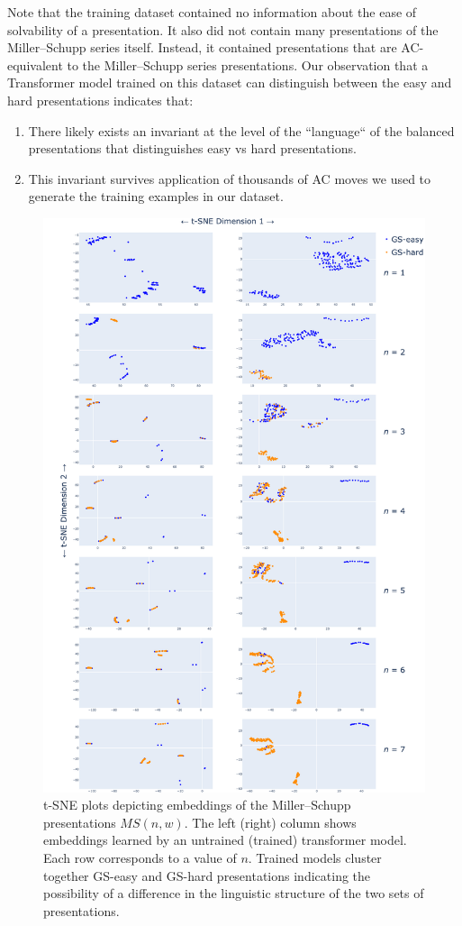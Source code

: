 Note that the training dataset contained no information about the ease of solvability of a presentation.
It also did not contain many presentations of the Miller--Schupp series itself.
Instead, it contained presentations that are AC-equivalent to the Miller--Schupp series presentations.
Our observation that a Transformer model trained on this dataset can distinguish between the easy and hard presentations indicates that:
\begin{enumerate}[label=\alph*)]
	\item There likely exists an invariant at the level of the ``language`` of the balanced presentations that distinguishes easy vs hard presentations.
	\item This invariant survives application of thousands of AC moves we used to generate the training examples in our dataset.
\end{enumerate}

\begin{figure}
	\centering
	\includegraphics[scale=0.23]{fig/embeddings.png}
	\captionsetup{width=1.1\textwidth}
	\caption{t-SNE plots depicting embeddings of the Miller--Schupp presentations $MS(n, w)$.
	The left (right) column shows embeddings learned by an untrained (trained) transformer model.
	Each row corresponds to a value of $n$.
	Trained models cluster together GS-easy and GS-hard presentations indicating the possibility of a difference in the linguistic structure of the two sets of presentations.}
	\label{fig:tsne_embeddings}
\end{figure}
